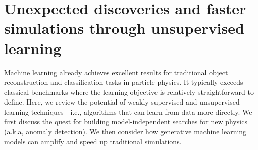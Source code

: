 \documentclass[12pt, a4paper, notitlepage, onecolumn]{article}
\begin{document}
\section{Unexpected discoveries and faster simulations through unsupervised learning}
\noindent Machine learning already achieves excellent results for traditional object reconstruction and classification tasks in particle physics. It typically exceeds classical benchmarks where the learning objective is relatively straightforward to define. Here, we review the potential of weakly supervised and unsupervised learning techniques - i.e., algorithms that can learn from data more directly.  We first discuss the quest for building model-independent searches for new physics (a.k.a, anomaly detection). We then consider how generative machine learning models can amplify and speed up traditional simulations.
\end{document}
